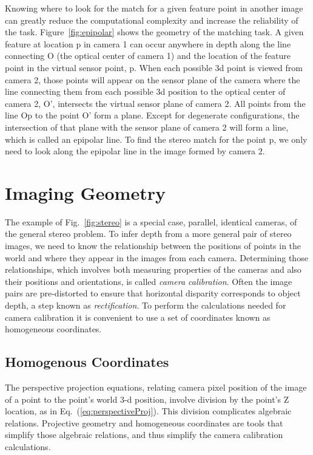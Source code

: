 Knowing where to look for the match for a given feature point in another image can greatly reduce the computational complexity and increase the reliability of the task.  Figure~\ref{fig:epipolar} shows the geometry of the matching task.  A given feature at location p in camera 1 can occur anywhere in depth along the line connecting O (the optical center of camera 1) and the location of the feature point in the virtual sensor point, p.  When each possible 3d point is viewed from camera 2, those points will appear on the sensor plane of the camera where the line connecting them from each possible 3d position to the optical center of camera 2, O', intersects the virtual sensor plane of camera 2.  All points from the line Op to the point O' form a plane.  Except for degenerate configurations, the intersection of that plane with the sensor plane of camera 2 will form a line, which is called an epipolar line.  To find the stereo match for the point p, we only need to look along the  epipolar line in the image formed by camera 2.





\section{Imaging Geometry}
The example of Fig.~\ref{fig:stereo} is a special case, parallel, identical cameras, of the general stereo problem.  To infer depth from a more general pair of stereo images, we need to know the relationship between the positions of points in the world and where they appear in the images from each camera.  Determining those relationships, which involves both measuring properties of the cameras and also their positions and orientations, is called {\em camera calibration}.
Often the image pairs are pre-distorted to ensure that horizontal disparity 
corresponds to object depth, a step known as {\em rectification}.
To perform the calculations needed for camera calibration it is convenient to use a set of coordinates known as homogeneous coordinates.

\subsection{Homogenous Coordinates}
The perspective projection equations, relating camera pixel position of the image of a point to the point's world 3-d position, involve division by the point's Z location, as in Eq.~(\ref{eq:perspectiveProj}).  This division complicates algebraic relations.  Projective geometry and homogeneous coordinates are tools that simplify those algebraic relations, and thus simplify the camera calibration calculations.

